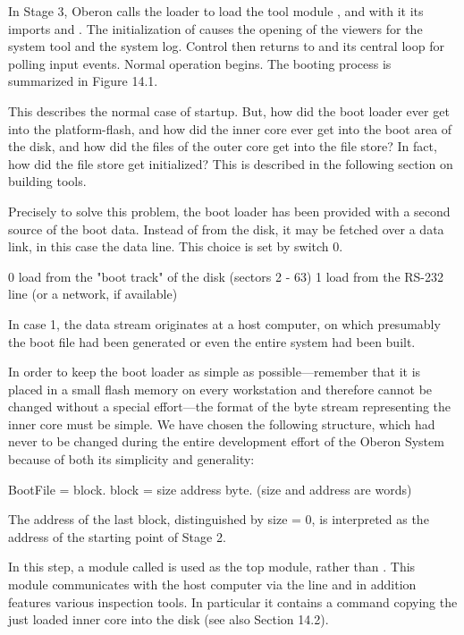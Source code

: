 In Stage 3, Oberon calls the loader to load the tool module , and with it its imports  and . The initialization of  causes the opening of the viewers for the system tool and the system log. Control then returns to  and its central loop for polling input events. Normal operation begins. The booting process is summarized in Figure 14.1.


This describes the normal case of startup. But, how did the boot loader ever get into the platform-flash, and how did the inner core ever get into the boot area of the disk, and how did the files of the outer core get into the file store? In fact, how did the file store get initialized? This is described in the following section on building tools.

Precisely to solve this problem, the boot loader has been provided with a second source of the boot data. Instead of from the disk, it may be fetched over a data link, in this case the  data line. This choice is set by switch 0.

0 load from the "boot track" of the disk (sectors 2 - 63)
1 load from the RS-232 line (or a network, if available)

In case 1, the data stream originates at a host computer, on which presumably the boot file had been generated or even the entire system had been built.

In order to keep the boot loader as simple as possible---remember that it is placed in a small flash memory on every workstation and therefore cannot be changed without a special effort---the format of the byte stream representing the inner core must be simple. We have chosen the following structure, which had never to be changed during the entire development effort of the Oberon System because of both its simplicity and generality:

BootFile = {block}.
block = size address {byte}. (size and address are words)

The address of the last block, distinguished by size = 0, is interpreted as the address of the starting point of Stage 2.

In this step, a module called  is used as the top module, rather than . This module communicates with the host computer via the  line and in addition features various inspection tools. In particular it contains a command copying the just loaded inner core into the disk (see also Section 14.2).

